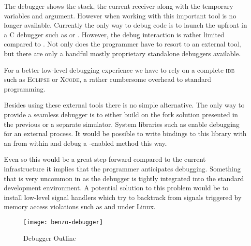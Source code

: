 The \PH debugger shows the stack, the current receiver along with the temporary variables and argument.
However when working with \B this important tool is no longer available.
Currently the only way to debug \B code is to launch the \VM upfront in a C debugger such as \GDB or \LLDB.
However, the debug interaction is rather limited compared to \PH.
Not only does the programmer have to resort to an external tool, but there are only a handful mostly proprietary standalone debuggers available.

For a better low-level debugging experience we have to rely on a complete \textsc{ide} such as \textsc{Eclipse} or \textsc{Xcode}, a rather cumbersome overhead to standard \PH programming.

Besides using these external tools there is no simple alternative.
The only way to provide a seamless debugger is to either build on the fork solution presented in the previous  or a separate simulator.
System libraries such as \ptrace enable debugging for an external process.
It would be possible to write bindings to this library with an \FFI from within \PH and debug a \B-enabled method this way.

Even so this would be a great step forward compared to the current infrastructure it implies that the programmer anticipates debugging.
Something that is very uncommon in \PH as the debugger is tightly integrated into the standard development environment.
A potential solution to this problem would be to install low-level signal handlers which try to backtrack from signals triggered by memory access violations such as  and  under Linux.

\begin{figure}[h]
	\centering
	\texttt{[image: benzo-debugger]}
	\caption{\B Debugger Outline}
\end{figure}

